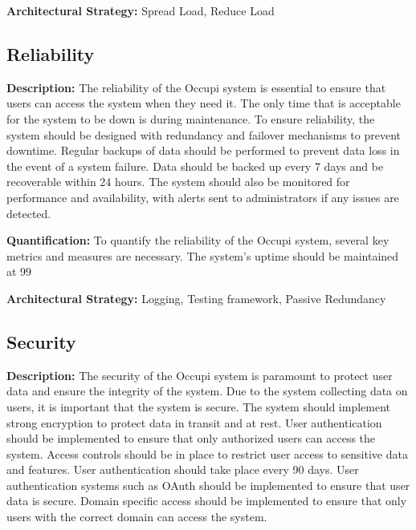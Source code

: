 \documentclass[11pt,a4paper]{article}
\begin{document}
\textbf{Architectural Strategy:} Spread Load, Reduce Load

\subsection*{Reliability}
\textbf{Description:} The reliability of the Occupi system is essential to ensure that users can access the system when they need it. The only time that is acceptable for the system to be down is during maintenance. To ensure reliability, the system should be designed with redundancy and failover mechanisms to prevent downtime. Regular backups of data should be performed to prevent data loss in the event of a system failure. Data should be backed up every 7 days and be recoverable within 24 hours. The system should also be monitored for performance and availability, with alerts sent to administrators if any issues are detected.

\textbf{Quantification:} To quantify the reliability of the Occupi system, several key metrics and measures are necessary. The system's uptime should be maintained at 99%

\textbf{Architectural Strategy:} Logging, Testing framework, Passive Redundancy

\subsection*{Security}
\textbf{Description:} The security of the Occupi system is paramount to protect user data and ensure the integrity of the system. Due to the system collecting data on users, it is important that the system is secure. The system should implement strong encryption to protect data in transit and at rest. User authentication should be implemented to ensure that only authorized users can access the system. Access controls should be in place to restrict user access to sensitive data and features. User authentication should take place every 90 days. User authentication systems such as OAuth should be implemented to ensure that user data is secure. Domain specific access should be implemented to ensure that only users with the correct domain can access the system.
\end{document}
